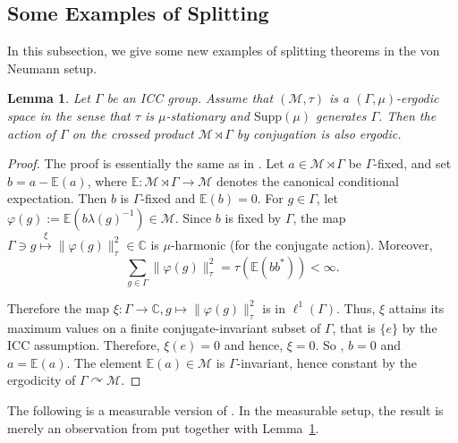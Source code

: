 \documentclass[12pt]{amsart}
\newtheorem{lemma}[thm]{Lemma}
\theoremstyle{definition}
\begin{document}
\subsection{Some Examples of Splitting} In this subsection, we give some new examples of splitting theorems in the von Neumann setup. 
\begin{lemma}
\label{lem:factor}
Let $\Gamma$ be an ICC group. Assume that $(\mathcal{M},\tau)$ is a $(\Gamma,\mu)$-ergodic space in the sense that $\tau$ is $\mu$-stationary and $\text{Supp}(\mu)$ generates $\Gamma$. Then the action of $
\Gamma$ on the crossed product $\mathcal{M}\rtimes\Gamma$ by conjugation is also ergodic.    
\end{lemma}
\begin{proof}
The proof is essentially the same as in \cite[Lemma~2.16]{kalantar2023invariant}. 
Let $a\in\mathcal{M}\rtimes\Gamma$ be $\Gamma$-fixed, and set $b=a-\mathbb{E}(a)$, where $\mathbb{E}: \mathcal{M}\rtimes \Gamma\rightarrow \mathcal{M}$ denotes the canonical conditional expectation. Then $b$ is $\Gamma$-fixed and $\mathbb{E}(b) = 0$. For $g\in\Gamma$, let $\varphi(g):=\mathbb{E}(b\lambda(g)^{-1}) \in\mathcal{M}$. Since $b$ is fixed by $\Gamma$, the map $\Gamma\ni g\overset{\xi}{\mapsto}\|\varphi(g)\|_{\tau}^2\in\mathbb{C}$ is $\mu$-harmonic (for the conjugate action). Moreover,
$$\sum_{g\in\Gamma}\|\varphi(g)\|_{\tau}^2=\tau(\mathbb{E}(bb^*))<\infty.$$

Therefore the map $\xi:\Gamma\to\mathbb{C}, g\mapsto \|\varphi(g)\|_{\tau}^2$ is in $\ell^1(\Gamma)$. Thus, $\xi$ attains its maximum values on a finite conjugate-invariant subset of $\Gamma$, that is $\{e\}$ by the ICC assumption. Therefore, $\xi(e)=0$  and hence, $\xi = 0$. So , $b=0$  and $a=\mathbb{E}(a)$. The element $\mathbb{E}(a)\in\mathcal{M}$ is $\Gamma$-invariant, hence constant by the ergodicity of $\Gamma\curvearrowright\mathcal{M}$.
    
\end{proof}
The following is a measurable version of \cite[Proposition~1.2]{amrutam2025splitting}. In the measurable setup, the result is merely an observation from \cite{ge1996tensor} put together with Lemma~\ref{lem:factor}.
\end{document}
